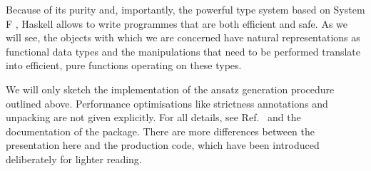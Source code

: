 Because of its purity and, importantly, the powerful type system based on System F \cite{Girard_1972}, Haskell allows to write programmes that are both efficient and safe. As we will see, the objects with which we are concerned have natural representations as functional data types and the manipulations that need to be performed translate into efficient, pure functions operating on these types.

We will only sketch the implementation of the ansatz generation procedure outlined above. Performance optimisations like strictness annotations and unpacking are not given explicitly. For all details, see Ref.\ \cite{Reinhart_2019} and the documentation \cite{Reinhart_2019_sparse-tensor} of the package. There are more differences between the presentation here and the production code, which have been introduced deliberately for lighter reading.

